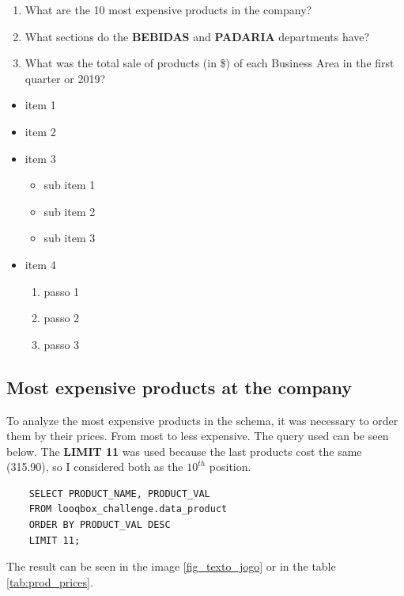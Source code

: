 \documentclass[a4paper, 12pt]{article}
\begin{document}
\begin{enumerate}
    \item What are the 10 most expensive products in the company?
    \item What sections do the \textbf{BEBIDAS} and \textbf{PADARIA} departments have?
    \item What was the total sale of products (in \$) of each Business Area in the first quarter or 2019?
\end{enumerate}

\begin{itemize}
    \item item 1
    \item item 2
    \item item 3
      \begin{itemize}
          \item sub item 1 
          \item sub item 2
          \item sub item 3
    \end{itemize}
    \item item 4
        \begin{enumerate}
            \item passo 1
            \item passo 2
            \item passo 3
        \end{enumerate}
\end{itemize}

\newpage
\subsection{Most expensive products at the company}

To analyze the most expensive products in the schema, it was necessary to order them by their prices. From most to less expensive. The query used can be seen below. The \textbf{LIMIT 11} was used because the last products cost the same (315.90), so I considered both as the $10^{th}$ position.

\begin{verbatim}
    SELECT PRODUCT_NAME, PRODUCT_VAL
    FROM looqbox_challenge.data_product
    ORDER BY PRODUCT_VAL DESC
    LIMIT 11;
\end{verbatim}

The result can be seen in the image \ref{fig_texto_jogo} or in the table \ref{tab:prod_prices}.
\end{document}
